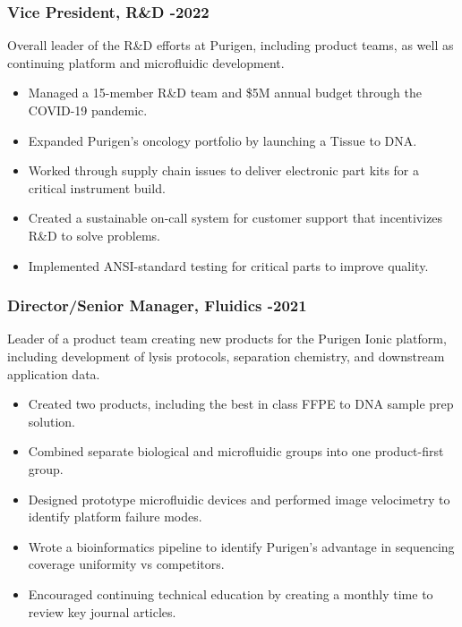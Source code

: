\documentclass{res}
\begin{document}
\begin{resume}
    \subsubsection{Vice President, R\&D -2022}
      \vspace{-0.1in}
      Overall leader of the R\&D efforts at Purigen, including product teams, as well as
      continuing platform and microfluidic development.
      \vspace{0.1in}
       \begin{itemize}
        \item Managed a 15-member R\&D team and \$5M annual budget through the COVID-19 pandemic.
        \item Expanded Purigen's oncology portfolio by launching a Tissue to DNA. 
        \item Worked through supply chain issues to deliver electronic part kits for a critical instrument build.
        \item Created a sustainable on-call system for customer support that incentivizes R\&D to solve problems.
        \item Implemented ANSI-standard testing for critical parts to improve quality.
       \end{itemize}

    \subsubsection{Director/Senior Manager, Fluidics -2021}
      \vspace{-0.1in}
      Leader of a product team creating new products for the Purigen Ionic platform,
      including development of lysis protocols, separation chemistry, and downstream application data.
      \vspace{0.1in}
       \begin{itemize}
        \item Created two products, including the best in class FFPE to DNA sample prep solution.
        \item Combined separate biological and microfluidic groups into one product-first group.
        \item Designed prototype microfluidic devices and performed image velocimetry to identify platform failure modes.
        \item Wrote a bioinformatics pipeline to identify Purigen's advantage in sequencing coverage uniformity vs competitors.
        \item Encouraged continuing technical education by creating a monthly time to review key journal articles. 
       \end{itemize}


\end{resume}
\end{document}
